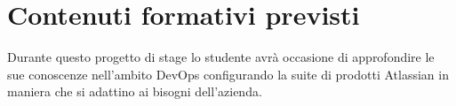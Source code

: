 \section*{Contenuti formativi previsti}
Durante questo progetto di stage lo studente avrà occasione di approfondire le sue conoscenze nell'ambito DevOps configurando la suite di prodotti Atlassian in maniera che si adattino ai bisogni dell'azienda.